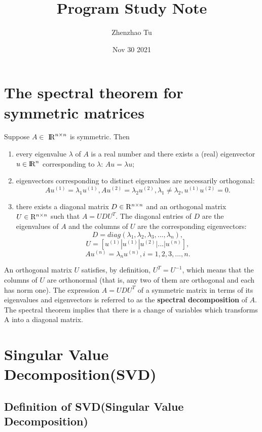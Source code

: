 \documentclass{article}
\title{Program Study Note}
\author{Zhenzhao Tu}
\date{Nov 30 2021}
\newcommand{\an}[1]{{\leavevmode\color{blue}{#1}}}
\begin{document}
\maketitle

\section{The spectral theorem for symmetric matrices}
Suppose $A \in$ 
${\rm I\!R}^{n \times n}$ is symmetric. Then
\\
\begin{enumerate}
	\item every eigenvalue $\lambda$ of $A$ is a real number and there exists a (real) eigenvector ${u \in \rm I\!R}^{n}$ corresponding to $\lambda$:  $Au=\lambda u$;
	\item eigenvectors corresponding to distinct eigenvalues are necessarily orthogonal: 
	\[Au^{(1)} = \lambda_1 u^{(1)} , Au^{(2)} = \lambda_2 u^{(2)}, \lambda_1 \neq \lambda_2, u^{(1)}u^{(2)} = 0.\]
	\item there exists a diagonal matrix  $D\in{\bf {\rm R}}^{n\times n}$ and an orthogonal matrix  $U\in{\bf {\rm R}}^{n\times n}$ such that $A=UDU^T$. The diagonal entries of $D$ are the eigenvalues of $A$ and the columns of $U$ are the corresponding eigenvectors: 
	\[D = diag(\lambda_1, \lambda_2, \lambda_3, ..., \lambda_n),\]
	\[U = [u^{(1)} | u^{(1)} | u^{(2)} | ... | u^{(n)}],\]
	\[Au^{(n)} = \lambda_n u^{(n)}, i = 1,2,3,...,n.\]
\end{enumerate}
An orthogonal matrix $U$ satisfies, by definition, $U^T=U^{-1}$, which means that the columns of $U$ are orthonormal (that is, any two of them are orthogonal and each has norm one). The expression $A=UDU^T$ of a symmetric matrix in terms of its eigenvalues and eigenvectors is referred to as the \textbf{spectral decomposition} of $A$. 
\\
The spectral theorem implies that there is a change of variables which transforms A into a diagonal matrix.

\an{Don't go into the proof yet. First state the SVD. Second, discuss some of its consequences at a high level. Third, prove it.}
\section{Singular Value Decomposition(SVD)}

\subsection{Definition of SVD(Singular Value Decomposition)}
\end{document}
